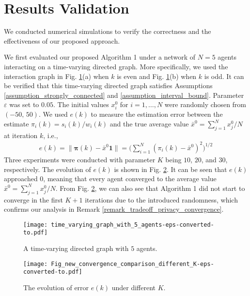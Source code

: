 \documentclass{IEEEtran}
\begin{document}
\section{Results Validation}

We conducted numerical simulations to verify the correctness and the effectiveness of our proposed approach.

We first evaluated our proposed Algorithm 1 under a network of $N=5$ agents interacting on a time-varying directed graph. More specifically, we used the interaction graph in Fig. \ref{fig_graph_time_varying}(a) when $k$ is even and Fig. \ref{fig_graph_time_varying}(b) when $k$ is odd. It can be verified that this time-varying directed graph satisfies Assumptions \ref{assumption_strongly_connected} and \ref{assumption_interval_bound}. Parameter $\varepsilon$ was set to $0.05$. The initial values $x_i^0$ for $i=1, \ldots, N$ were randomly chosen from $(-50, \, 50)$. We used $e(k)$ to measure the estimation error between the estimate $\pi_i(k)=s_i(k)/w_i(k)$ and the true average value $\bar{x}^0={\sum_{j=1}^{N}x_j^0}/{N}$ at iteration $k$, i.e.,
\begin{equation}\label{convergence_error}
\begin{aligned}
e(k)=\big\|\boldsymbol{\pi}(k) - \bar{x}^0 \mathbf{1} \big\|= \big( \sum\limits_{i=1}^{N}(\pi_i(k)-\bar{x}^0)^{2}\big)^{1/2}
\end{aligned}
\end{equation}
Three experiments were conducted with parameter $K$ being $10$, $20$, and $30$, respectively. The evolution of $e(k)$ is shown in Fig. \ref{convergence_error_figure}. It can be seen that $e(k)$ approached $0$, meaning that every agent converged to the average value $\bar{x}^0=\sum_{j=1}^{N}x_j^0/{N}$. From Fig. \ref{convergence_error_figure}, we can also see that Algorithm 1 did not start to converge in the first $K+1$ iterations due to the introduced randomness, which confirms our analysis in Remark \ref{remark_tradeoff_privacy_convergence}.

\begin{figure}[h]
	\begin{center}
		\texttt{[image: time\_varying\_graph\_with\_5\_agents-eps-converted-to.pdf]}
	\end{center}
	\caption{A time-varying directed graph with $5$ agents.}
	\label{fig_graph_time_varying}
\end{figure}

\begin{figure}[h]
	\begin{center}
		\texttt{[image: Fig\_new\_convergence\_comparison\_different\_K-eps-converted-to.pdf]}
	\end{center}
	\caption{The evolution of error $e(k)$ under different $K$.}
	\label{convergence_error_figure}
\end{figure}
\end{document}
